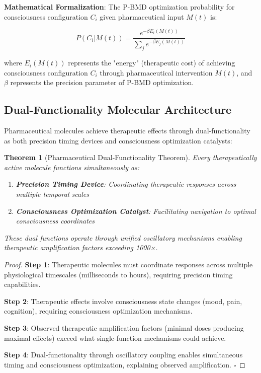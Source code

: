 \documentclass[12pt,a4paper]{article}
\newtheorem{theorem}{Theorem}
\begin{document}
\textbf{Mathematical Formalization}:
The P-BMD optimization probability for consciousness configuration $C_i$ given pharmaceutical input $M(t)$ is:

$$P(C_i | M(t)) = \frac{e^{-\beta E_i(M(t))}}{\sum_j e^{-\beta E_j(M(t))}}$$

where $E_i(M(t))$ represents the "energy" (therapeutic cost) of achieving consciousness configuration $C_i$ through pharmaceutical intervention $M(t)$, and $\beta$ represents the precision parameter of P-BMD optimization.

\subsection{Dual-Functionality Molecular Architecture}

Pharmaceutical molecules achieve therapeutic effects through dual-functionality as both precision timing devices and consciousness optimization catalysts:

\begin{theorem}[Pharmaceutical Dual-Functionality Theorem]
Every therapeutically active molecule functions simultaneously as:
\begin{enumerate}
\item \textbf{Precision Timing Device}: Coordinating therapeutic responses across multiple temporal scales
\item \textbf{Consciousness Optimization Catalyst}: Facilitating navigation to optimal consciousness coordinates
\end{enumerate}
These dual functions operate through unified oscillatory mechanisms enabling therapeutic amplification factors exceeding 1000×.
\end{theorem}

\begin{proof}
\textbf{Step 1}: Therapeutic molecules must coordinate responses across multiple physiological timescales (milliseconds to hours), requiring precision timing capabilities.

\textbf{Step 2}: Therapeutic effects involve consciousness state changes (mood, pain, cognition), requiring consciousness optimization mechanisms.

\textbf{Step 3}: Observed therapeutic amplification factors (minimal doses producing maximal effects) exceed what single-function mechanisms could achieve.

\textbf{Step 4}: Dual-functionality through oscillatory coupling enables simultaneous timing and consciousness optimization, explaining observed amplification. $\square$
\end{proof}
\end{document}
